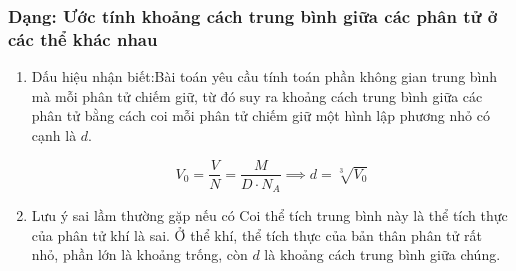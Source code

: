 \subsubsection{Dạng: Ước tính khoảng cách trung bình giữa các phân tử ở các thể khác nhau}

\begin{phuongphap}
	\begin{enumerate}
		\item Dấu hiệu nhận biết:Bài toán yêu cầu tính toán phần không gian trung bình mà mỗi phân tử chiếm giữ, từ đó suy ra khoảng cách trung bình giữa các phân tử bằng cách coi mỗi phân tử chiếm giữ một hình lập phương nhỏ có cạnh là $d$.
	
			\begin{equation}
				V_0 = \dfrac{V}{N} = \dfrac{M}{D \cdot N_A} \implies d = \sqrt[3]{V_0}
				\label{eq:mol_dist}
		\end{equation}
		\item Lưu ý sai lầm thường gặp nếu có Coi thể tích trung bình này là thể tích thực của phân tử khí là sai. Ở thể khí, thể tích thực của bản thân phân tử rất nhỏ, phần lớn là khoảng trống, còn $d$ là khoảng cách trung bình giữa chúng.
	\end{enumerate}
\end{phuongphap}

